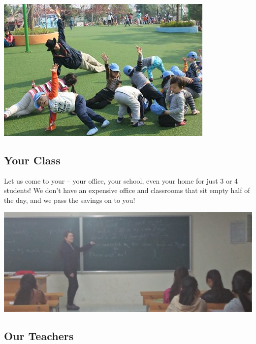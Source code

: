 \documentclass[11pt]{article}
\begin{document}
\begin{center}
\includegraphics[width=.9\linewidth]{./images/kindyStretch.jpg}
\end{center}
\subsection{Your Class}
\label{sec:org73931c2}
Let us come to your – your office, your school, even your home for just 3 or 4 students!  We don't
have an expensive office and classrooms that sit empty half of the day, and we pass the savings on to you!
\begin{center}
\includegraphics[width=.9\linewidth]{./images/board1.jpg}
\end{center}
\subsection{Our Teachers}
\label{sec:orgc1ff8db}
\end{document}
